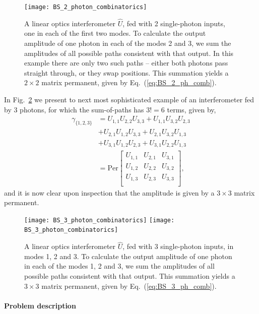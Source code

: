 \begin{figure}[!htbp]
\texttt{[image: BS\_2\_photon\_combinatorics]}
\caption{A linear optics interferometer $\hat{U}$, fed with 2 single-photon inputs, one in each of the first two modes. To calculate the output amplitude of one photon in each of the modes 2 and 3, we sum the amplitudes of all possible paths consistent with that output. In this example there are only two such paths -- either both photons pass straight through, or they swap positions. This summation yields a \mbox{$2\times 2$} matrix permanent, given by Eq.~(\ref{eq:BS_2_ph_comb}).}\label{fig:BS_2_comb}	
\end{figure}

In Fig.~\ref{fig:BS_3_comb} we present to next most sophisticated example of an interferometer fed by 3 photons, for which the sum-of-paths has \mbox{$3!=6$} terms, given by,
\begin{align} \label{eq:BS_3_ph_comb}
\gamma_{\{1,2,3\}} &= U_{1,1}U_{2,2}U_{3,3} + U_{1,1}U_{3,2}U_{2,3} \nonumber \\
&+ U_{2,1}U_{1,2}U_{3,3} + U_{2,1}U_{3,2}U_{1,3} \nonumber \\
&+ U_{3,1}U_{1,2}U_{2,3} + U_{3,1}U_{2,2}U_{1,3}
\nonumber \\
&= \mathrm{Per} \left[ {\begin{array}{ccc}
   U_{1,1} & U_{2,1} & U_{3,1} \\
   U_{1,2} & U_{2,2} & U_{3,2} \\
   U_{1,3} & U_{2,3} & U_{3,3} \\
  \end{array} } \right],
\end{align}
and it is now clear upon inspection that the amplitude is given by a \mbox{$3\times 3$} matrix permanent.

\begin{figure}[!htbp]
\pubmode
	\texttt{[image: BS\_3\_photon\_combinatorics]}
\else
	\texttt{[image: BS\_3\_photon\_combinatorics]}
\fi
\caption{A linear optics interferometer $\hat{U}$, fed with 3 single-photon inputs, in modes 1, 2 and 3. To calculate the output amplitude of one photon in each of the modes 1, 2 and 3, we sum the amplitudes of all possible paths consistent with that output. This summation yields a \mbox{$3\times 3$} matrix permanent, given by Eq.~(\ref{eq:BS_3_ph_comb}).}\label{fig:BS_3_comb}	
\end{figure}

\paragraph{Problem description}

